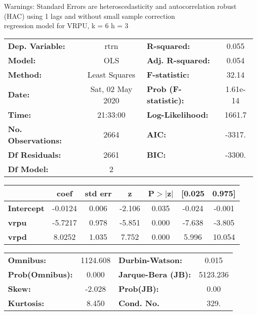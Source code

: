 Warnings: \newline
 [1] Standard Errors are heteroscedasticity and autocorrelation robust (HAC) using 1 lags and without small sample correction\\ 

regression model for VRPU, k = 6 h = 3\begin{center}
\begin{tabular}{lclc}
\toprule
\textbf{Dep. Variable:}    &       rtrn       & \textbf{  R-squared:         } &     0.055   \\
\textbf{Model:}            &       OLS        & \textbf{  Adj. R-squared:    } &     0.054   \\
\textbf{Method:}           &  Least Squares   & \textbf{  F-statistic:       } &     32.14   \\
\textbf{Date:}             & Sat, 02 May 2020 & \textbf{  Prob (F-statistic):} &  1.61e-14   \\
\textbf{Time:}             &     21:33:00     & \textbf{  Log-Likelihood:    } &    1661.7   \\
\textbf{No. Observations:} &        2664      & \textbf{  AIC:               } &    -3317.   \\
\textbf{Df Residuals:}     &        2661      & \textbf{  BIC:               } &    -3300.   \\
\textbf{Df Model:}         &           2      & \textbf{                     } &             \\
\bottomrule
\end{tabular}
\begin{tabular}{lcccccc}
                   & \textbf{coef} & \textbf{std err} & \textbf{z} & \textbf{P$> |$z$|$} & \textbf{[0.025} & \textbf{0.975]}  \\
\midrule
\textbf{Intercept} &      -0.0124  &        0.006     &    -2.106  &         0.035        &       -0.024    &       -0.001     \\
\textbf{vrpu}      &      -5.7217  &        0.978     &    -5.851  &         0.000        &       -7.638    &       -3.805     \\
\textbf{vrpd}      &       8.0252  &        1.035     &     7.752  &         0.000        &        5.996    &       10.054     \\
\bottomrule
\end{tabular}
\begin{tabular}{lclc}
\textbf{Omnibus:}       & 1124.608 & \textbf{  Durbin-Watson:     } &    0.015  \\
\textbf{Prob(Omnibus):} &   0.000  & \textbf{  Jarque-Bera (JB):  } & 5123.236  \\
\textbf{Skew:}          &  -2.028  & \textbf{  Prob(JB):          } &     0.00  \\
\textbf{Kurtosis:}      &   8.450  & \textbf{  Cond. No.          } &     329.  \\
\bottomrule
\end{tabular}
\end{center}

